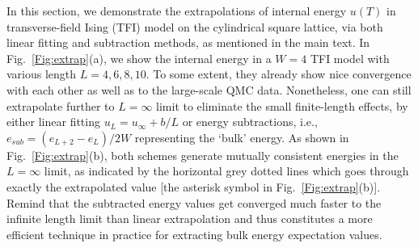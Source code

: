 \documentclass[aps,prx,twocolumn,showpacs,psfig,superscriptaddress,longbibliography]{revtex4-1}
\newcommand{\Fig}[1]{Fig.~\ref{#1}}
\begin{document}
In this section, we demonstrate the extrapolations of internal energy $u(T)$ in transverse-field Ising (TFI) model on the cylindrical square lattice, via both linear fitting and subtraction methods, as mentioned in the main text.
In \Fig{Fig:extrap}(a), we show the internal energy in a $W=4$ TFI model with various length $L=4, 6, 8, 10$. To some extent, they already show nice convergence with each other as well as to the large-scale QMC data. 
Nonetheless, one can still extrapolate further to $L=\infty$ limit to eliminate the small finite-length effects, by either linear fitting $u_L = u_{\infty} + b/L$ or energy subtractions, i.e., $e_{sub} = (e_{L+2}-e_{L})/2W$ representing the `bulk' energy. 
As shown in \Fig{Fig:extrap}(b), both schemes generate mutually consistent energies in the $L=\infty$ limit, as indicated by the horizontal grey dotted lines which goes through exactly the extrapolated value [the asterisk symbol in \Fig{Fig:extrap}(b)]. Remind that the subtracted energy values get converged much faster to the infinite length limit than linear extrapolation and thus constitutes a more efficient technique in practice for extracting bulk energy expectation values. 

%
\end{document}
